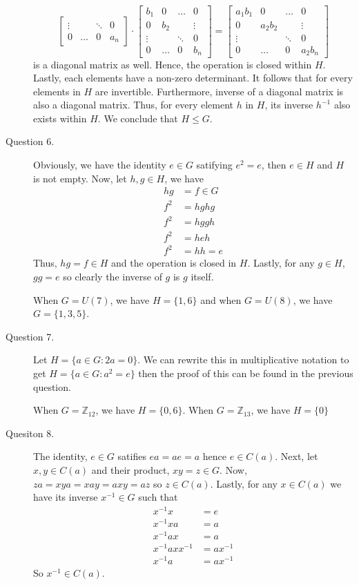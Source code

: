\documentclass[]{article}
\begin{document}
\begin{description}
\[\begin{bmatrix}
    \vdots && \ddots & 0 \\
    0 & \dots & 0 & a_n
 \end{bmatrix}  
 \cdot
 \begin{bmatrix}
    b_1 & 0 & \dots & 0\\
    0 & b_2 && \vdots\\
    \vdots && \ddots & 0 \\
    0 & \dots & 0 & b_n
 \end{bmatrix}  
 =
 \begin{bmatrix}
    a_1b_1 & 0 & \dots & 0\\
    0 & a_2b_2 && \vdots\\
    \vdots && \ddots & 0 \\
    0 & \dots & 0 & a_2b_n
 \end{bmatrix}  
\] is a diagonal matrix as well. Hence, the operation is closed within $H$. Lastly, each elements have a non-zero determinant. It follows that for every elements in $H$ are invertible. Furthermore, inverse of a diagonal matrix is also a diagonal matrix. Thus, for every element $h$ in $H$, its inverse $h^{-1}$ also exists within $H$. We conclude that $H \leqslant G$.
\item[Question 6.] Obviously, we have the identity $e \in G$ satifying $e^2 = e$, then $e \in H$ and $H$ is not empty. Now, let $h,g \in H$, we have \begin{align*}
    hg &= f \in G\\
    f^2 &= hghg \\
    f^2 &= hggh \\
    f^2 &= heh\\
    f^2 &= hh = e
\end{align*} Thus, $hg = f \in H$ and the operation is closed in $H$. Lastly, for any $g \in H$, $gg = e$ so clearly the inverse of $g$ is $g$ itself.
    

When $G = U(7)$, we have $H = \{1,6\}$ and when $G = U(8)$, we have $G = \{1,3,5\}$.

\item[Question 7.] Let $H = \{a \in G : 2a =0\}$. We can rewrite this in multiplicative notation to get $H = \{a \in G : a^2 = e\}$ then the proof of this can be found in the previous question.

When $G = \mathbb{Z}_{12}$, we have $H = \{0,6\}$. When $G = \mathbb{Z}_{13}$, we have $H = \{0\}$
\item[Quesiton 8.] The identity, $e \in G$ satifies $ ea = ae = a$ hence $e \in C(a)$. Next, let $x,y \in C(a)$ and their product, $xy = z \in G$. Now, $za = xya = xay = axy = az$ so $z \in C(a)$. Lastly, for any $x \in C(a)$ we have its inverse $x^{-1} \in G$ such that \begin{align*}
    x^{-1} x &= e\\
    x^{-1} x a&= a\\
    x^{-1} ax&= a\\
    x^{-1} axx^{-1}&= ax^{-1}\\
    x^{-1} a&= ax^{-1}
\end{align*}So $x^{-1} \in C(a)$.
\end{description}
\end{document}
